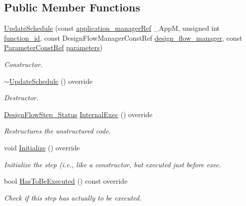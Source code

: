 \subsection*{Public Member Functions}
\begin{DoxyCompactItemize}
\item 
\hyperlink{classUpdateSchedule_a2bf718469aa4f8071f3ae59c0faff58f}{Update\+Schedule} (const \hyperlink{application__manager_8hpp_a04ccad4e5ee401e8934306672082c180}{application\+\_\+manager\+Ref} \+\_\+\+AppM, unsigned int \hyperlink{classFunctionFrontendFlowStep_a58ef2383ad1a212a8d3f396625a4b616}{function\+\_\+id}, const Design\+Flow\+Manager\+Const\+Ref \hyperlink{classDesignFlowStep_ab770677ddf087613add30024e16a5554}{design\+\_\+flow\+\_\+manager}, const \hyperlink{Parameter_8hpp_a37841774a6fcb479b597fdf8955eb4ea}{Parameter\+Const\+Ref} \hyperlink{classDesignFlowStep_a802eaafe8013df706370679d1a436949}{parameters})
\begin{DoxyCompactList}\small\item\em Constructor. \end{DoxyCompactList}\item 
\hyperlink{classUpdateSchedule_a8eaeedb09571da61efac4a8a46213930}{$\sim$\+Update\+Schedule} () override
\begin{DoxyCompactList}\small\item\em Destructor. \end{DoxyCompactList}\item 
\hyperlink{design__flow__step_8hpp_afb1f0d73069c26076b8d31dbc8ebecdf}{Design\+Flow\+Step\+\_\+\+Status} \hyperlink{classUpdateSchedule_aae8f0a93b502c3bb5c568e164b48e504}{Internal\+Exec} () override
\begin{DoxyCompactList}\small\item\em Restructures the unstructured code. \end{DoxyCompactList}\item 
void \hyperlink{classUpdateSchedule_a4f3faaefc08037c8c273fef044f5bb60}{Initialize} () override
\begin{DoxyCompactList}\small\item\em Initialize the step (i.\+e., like a constructor, but executed just before exec. \end{DoxyCompactList}\item 
bool \hyperlink{classUpdateSchedule_a8b63b0bd4821e2759cffe3a86910e430}{Has\+To\+Be\+Executed} () const override
\begin{DoxyCompactList}\small\item\em Check if this step has actually to be executed. \end{DoxyCompactList}\end{DoxyCompactItemize}
